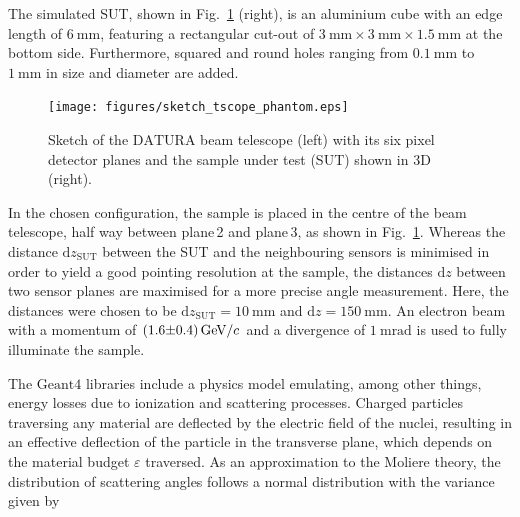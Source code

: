 \documentclass{PoS}
\newcommand{\eV}{\ensuremath{\textrm{eV}}}
\newcommand{\cspeed}{\ensuremath{\mathnormal{c}}}
\newcommand{\Datura}{\ensuremath{\textrm{DATURA}}}
\newcommand{\dz}{\ensuremath{\textrm{d}z}}
\newcommand{\dzsut}{\ensuremath{\textrm{d}z_{\textrm{SUT}}}}
\newcommand{\Geant}{\ensuremath{\textrm{Geant4}}}
\begin{document}
The simulated SUT, shown in Fig.~\ref{fig:setup} (right), is an aluminium cube with an edge length of $\SI{6}{\mm}$,
 featuring a rectangular cut-out of $\SI{3}{\mm}\times\SI{3}{\mm}\times\SI{1.5}{\mm}$ at the bottom side. 
Furthermore, squared and round holes ranging from $\SI{0.1}{\mm}$ to $\SI{1}{\mm}$ in size and diameter are added.%

\begin{figure}[!b]
	\center
	\texttt{[image: figures/sketch\_tscope\_phantom.eps]}
	\hspace{30pt}
	\caption[Sketch of the Datura beam telescope]{Sketch of the $\Datura$ beam telescope (left) with its six pixel detector planes and the sample under test (SUT) shown in 3D (right). %
	}
	\label{fig:setup}
\end{figure}

In the chosen configuration, the sample is placed in the centre of the beam telescope, half way between plane\,2 and plane\,3, as shown in Fig.~\ref{fig:setup}. %
Whereas the distance $\dzsut$ between the SUT and the neighbouring sensors is minimised in order to yield a good pointing resolution at the sample,
 the distances $\dz$ between two sensor planes are maximised for a more precise angle measurement.
Here, the distances were chosen to be $\dzsut =\SI{10}{\mm}$ and $\dz=\SI{150}{\mm}$. 
An electron beam with a momentum of $\SI{1.6(4)}{\giga\eV/\cspeed}$ and a divergence of $\SI{1}{\milli\radian}$ is used to fully illuminate the sample. 

The $\Geant$ libraries include a physics model emulating, among other things, energy losses due to ionization and scattering processes.
Charged particles traversing any material are deflected by the electric field of the nuclei, resulting in an effective deflection of the particle in the transverse plane,
 which depends on the material budget $\varepsilon$ traversed. 
As an approximation to the Moliere theory, the distribution of scattering angles follows a normal distribution with the variance given by~\cite{ref:scatteringhighland, ref:pdg2016} 
\end{document}
